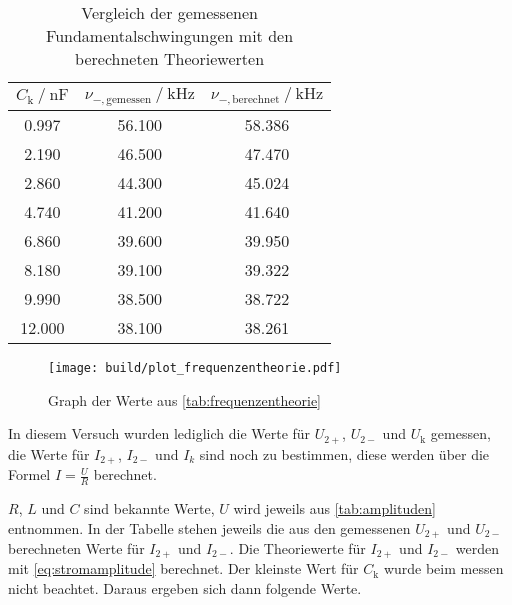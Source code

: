 \begin{table}
  \centering
  \caption{Vergleich der gemessenen Fundamentalschwingungen mit den berechneten Theoriewerten}
  \label{tab:frequenzentheorie}
  \begin{tabular}{c c c}
    \toprule 
    $C_\text{k} \:/\: \si{\nano\farad}$ & $\nu _{-,\text{gemessen}} \:/\: \si{\kilo\hertz}$ & $\nu _{-,\text{berechnet}} \:/\: \si{\kilo\hertz}$    \\ 
    \midrule 
    0.997 & 56.100 & 58.386 \\
    2.190 & 46.500 & 47.470 \\
    2.860 & 44.300 & 45.024 \\
    4.740 & 41.200 & 41.640 \\
    6.860 & 39.600 & 39.950 \\
    8.180 & 39.100 & 39.322 \\
    9.990 & 38.500 & 38.722 \\
    12.000 & 38.100 & 38.261 \\
    \bottomrule
  \end{tabular}
\end{table}

\begin{figure}
    \centering
    \texttt{[image: build/plot\_frequenzentheorie.pdf]}
    \caption{Graph der Werte aus \autoref{tab:frequenzentheorie}}
    \label{fig:frequenzenthorie_plot}
\end{figure}

In diesem Versuch wurden lediglich die Werte für $U_{2+}$, $U_{2-}$ und $U_\text{k}$ gemessen, die Werte für $I_{2+}$, $I_{2-}$ und $I_k$ sind noch zu bestimmen, diese werden über die Formel $I = \frac{U}{R}$ berechnet.

$R$, $L$ und $C$ sind bekannte Werte, $U$ wird jeweils aus \autoref{tab:amplituden} entnommen. In der Tabelle stehen jeweils die aus den gemessenen $U_{2+}$ und $U_{2-}$ berechneten Werte für $I_{2+}$ und $I_{2-}$. Die Theoriewerte für $I_{2+}$ und $I_{2-}$ werden mit \autoref{eq:stromamplitude} berechnet. Der kleinste Wert für $C_\text{k}$ wurde beim messen nicht beachtet. Daraus ergeben sich dann folgende Werte.

